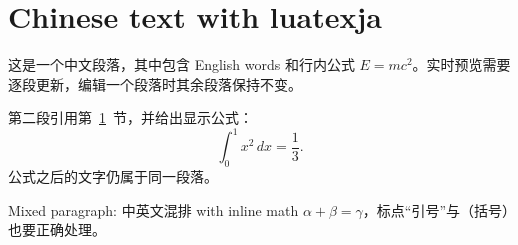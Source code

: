 \documentclass{article}
\begin{document}
\section{Chinese text with luatexja}\label{sec:ja}
这是一个中文段落，其中包含 English words 和行内公式 $E=mc^2$。实时预览需要逐段更新，编辑一个段落时其余段落保持不变。

第二段引用第~\ref{sec:ja}~节，并给出显示公式：
\[ \int_0^1 x^2\,dx = \frac{1}{3}. \]
公式之后的文字仍属于同一段落。

Mixed paragraph: 中英文混排 with inline math $\alpha+\beta=\gamma$，标点“引号”与（括号）也要正确处理。
\end{document}
